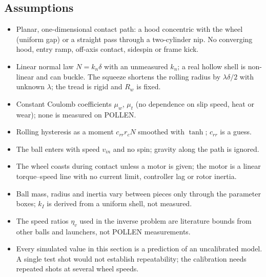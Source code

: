 \subsection{Assumptions}
\label{sec:launcher:assumptions}

\begin{itemize}
  \item Planar, one-dimensional contact path: a hood concentric with the wheel (uniform gap) or a straight
        pass through a two-cylinder nip. No converging hood, entry ramp, off-axis contact, sidespin or frame
        kick.
  \item Linear normal law $N = k_n\delta$ with an unmeasured $k_n$; a real hollow shell is non-linear and can
        buckle. The squeeze shortens the rolling radius by $\lambda\delta/2$ with unknown $\lambda$; the tread is
        rigid and $R_w$ is fixed.
  \item Constant Coulomb coefficients $\mu_w$, $\mu_t$ (no dependence on slip speed, heat or wear); none is
        measured on POLLEN.
  \item Rolling hysteresis as a moment $c_{rr} r_c N$ smoothed with $\tanh$; $c_{rr}$ is a guess.
  \item The ball enters with speed $v_{in}$ and no spin; gravity along the path is ignored.
  \item The wheel coasts during contact unless a motor is given; the motor is a linear torque--speed line
        with no current limit, controller lag or rotor inertia.
  \item Ball mass, radius and inertia vary between pieces only through the parameter boxes; $k_I$ is derived
        from a uniform shell, not measured.
  \item The speed ratios $\eta_v$ used in the inverse problem are literature bounds from other balls and
        launchers, not POLLEN measurements.
  \item Every simulated value in this section is a prediction of an uncalibrated model. A single test shot
        would not establish repeatability; the calibration needs repeated shots at several wheel speeds.
\end{itemize}
